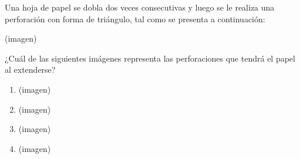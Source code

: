 \begin{problem}
    Una hoja de papel se dobla dos veces consecutivas y luego se le realiza una perforación con forma de triángulo, tal como se presenta a continuación:

    \begin{center}
    (imagen)
    \end{center}

    ¿Cuál de las siguientes imágenes representa las perforaciones que tendrá el papel al extenderse?

    \begin{enumerate}[label=\Alph*.]
        \item (imagen)
        \item (imagen)
        \item (imagen)
        \item (imagen)
    \end{enumerate}
\end{problem}
